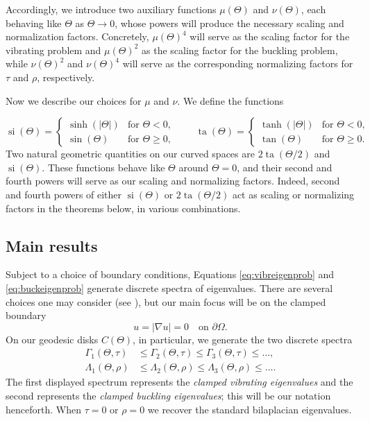 \documentclass[11pt]{amsart}
\theoremstyle{definition}
\numberwithin{equation}{section}
\newcommand{\grad}{\nabla}
\newcommand{\si}{\operatorname{si}}
\newcommand{\ta}{\operatorname{ta}}
\begin{document}
Accordingly, we introduce two auxiliary functions $\mu(\Theta)$ and $\nu(\Theta)$, each behaving like $\Theta$ as $\Theta\to 0$, whose powers will produce the necessary scaling and normalization factors. Concretely, $\mu(\Theta)^4$ will serve as the scaling factor for the vibrating problem and $\mu(\Theta)^2$ as the scaling factor for the buckling problem, while $\nu(\Theta)^2$ and $\nu(\Theta)^4$ will serve as the corresponding normalizing factors for $\tau$ and $\rho$, respectively.


Now we describe our choices for $\mu$ and $\nu$. We define the functions

\[
\si(\Theta) = 
\begin{cases} 
\sinh(|\Theta|) & \text{for } \Theta < 0, \\
\sin(\Theta) & \text{for } \Theta \geq 0,
\end{cases} \qquad \ta(\Theta) = 
\begin{cases} 
\tanh(|\Theta|) & \text{for } \Theta < 0, \\
\tan(\Theta) & \text{for } \Theta \geq 0.
\end{cases}
\]
Two natural geometric quantities on our curved spaces are $2\ta(\Theta/2)$ and $\si(\Theta)$. These functions behave like $\Theta$ around $\Theta = 0$, and their second and fourth powers will serve as our scaling and normalizing factors. Indeed, second and fourth powers of either $\si(\Theta)$ or $2\ta(\Theta/2)$ act as scaling or normalizing factors in the theorems below, in various combinations.


\subsection*{Main results}

Subject to a choice of boundary conditions, Equations \eqref{eq:vibreigenprob} and \eqref{eq:buckeigenprob} generate discrete spectra of eigenvalues. There are several choices one may consider (see \cite{C11}), but our main focus will be on the clamped boundary
\[
u = |\grad u| = 0 \quad \text{on } \partial \Omega.
\]
On our geodesic disks $C(\Theta)$, in particular, we generate the two discrete spectra
\begin{align*}
\Gamma_1(\Theta, \tau) &\leq \Gamma_2(\Theta, \tau) \leq \Gamma_3(\Theta, \tau) \leq \dots , \\
\Lambda_1(\Theta, \rho) &\leq \Lambda_2(\Theta, \rho) \leq \Lambda_3(\Theta, \rho) \leq \dots.
\end{align*}
The first displayed spectrum represents the \textit{clamped vibrating eigenvalues} and the second represents the \textit{clamped buckling eigenvalues}; this will be our notation henceforth. When $\tau =0$ or $\rho = 0$ we recover the standard bilaplacian eigenvalues.
\end{document}

